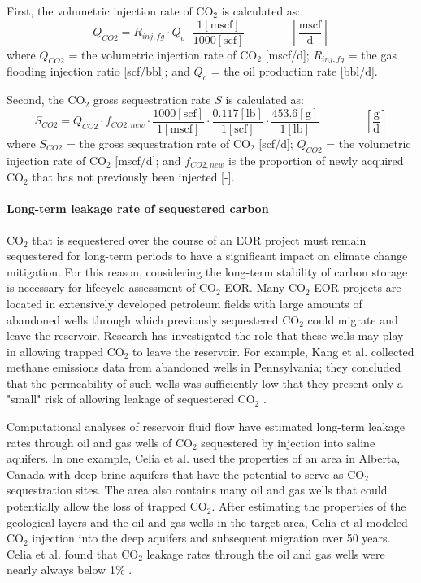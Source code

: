 \documentclass[11pt]{report}
\newcommand{\eqnunitfrac}[2]{\quad\quad \scriptstyle{\left[\frac{\text{#1}}{\text{#2}}\right]}}
\begin{document}
First, the volumetric injection rate of CO$_2$ is calculated as: 
\begin{equation} \label{eq:VolumetricFloodGasInjectionRate}
Q_{CO2} = R_{inj,fg} \cdot Q_{o} \cdot \frac{1 [\text{mscf}]}{1000 [\text{scf}]} \quad\quad\eqnunitfrac{mscf}{d}
\end{equation}
where $Q_{CO2}$ = the volumetric injection rate of CO$_2$ [mscf/d]; $R_{inj,fg}$ = the gas flooding injection ratio [scf/bbl]; and $Q_{o}$ = the oil production rate [bbl/d].

Second, the CO$_2$ gross sequestration rate $S$ is calculated as: 
\begin{equation} \label{eq:CO2Sequestration}
S_{CO2} = Q_{CO2} \cdot f_{CO2,new} \cdot \frac{1000 [\text{scf}]}{1 [\text{mscf}]} \cdot \frac{0.117 [\text{lb}]}{1 [\text{scf}]} \cdot \frac{453.6 [\text{g}]}{1 [\text{lb}]} \quad\quad\eqnunitfrac{g}{d}
\end{equation}
where $S_{CO2}$ = the gross sequestration rate of CO$_2$ [scf/d]; $Q_{CO2}$ = the volumetric injection rate of CO$_2$ [mscf/d]; and $f_{CO2,new}$ is the proportion of newly acquired CO$_2$ that has not previously been injected [-].


\paragraph{Long-term leakage rate of sequestered carbon} \label{par:LongTermLeakageRate}
CO$_2$ that is sequestered over the course of an EOR project must remain sequestered for long-term periods to have a significant impact on climate change mitigation. For this reason, considering the long-term stability of carbon storage is necessary for lifecycle assessment of CO$_2$-EOR.  Many CO$_2$-EOR projects are located in extensively developed petroleum fields with large amounts of abandoned wells through which previously sequestered CO$_2$ could migrate and leave the reservoir. Research has investigated the role that these wells may play in allowing trapped CO$_2$ to leave the reservoir. For example, Kang et al. collected methane emissions data from abandoned wells in Pennsylvania; they concluded that the permeability of such wells was sufficiently low that they present only a "small" risk of allowing leakage of sequestered CO$_2$ \cite{Kang2015}.  

Computational analyses of reservoir fluid flow have estimated long-term leakage rates through oil and gas wells of CO$_2$ sequestered by injection into saline aquifers. In one example, Celia et al. \cite{Celia2011} used the properties of an area in Alberta, Canada with deep brine aquifers that have the potential to serve as CO$_2$ sequestration sites. The area also contains many oil and gas wells that could potentially allow the loss of trapped CO$_2$. After estimating the properties of the geological layers and the oil and gas wells in the target area, Celia et al modeled CO$_2$ injection into the deep aquifers and subsequent migration over 50 years. Celia et al. found that CO$_2$ leakage rates through the oil and gas wells were nearly always below 1\%  \cite{Celia2011}.
\end{document}
